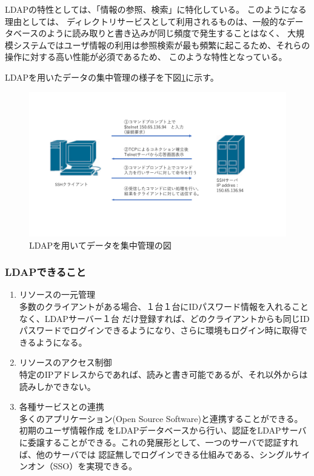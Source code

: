 \documentclass[11pt,a4j,titlepage]{jreport}
\begin{document}
LDAPの特性としては、「情報の参照、検索」に特化している。
このようになる理由としては、
ディレクトリサービスとして利用されるものは、一般的なデータベースのように読み取りと書き込みが同じ頻度で発生することはなく、
大規模システムではユーザ情報の利用は参照検索が最も頻繁に起こるため、それらの操作に対する高い性能が必須であるため、
このような特性となっている。

LDAPを用いたデータの集中管理の様子を下図\ref{LDAP_data_manage}に示す。
\begin{figure}[h]
    \centering
    \includegraphics[width=1.0\textwidth, page=10]{graphs/network_archtecture.pdf}
    \caption{LDAPを用いてデータを集中管理の図}
    \label{LDAP_data_manage}
\end{figure}


\subsubsection*{LDAPできること}
\begin{enumerate}
    \setlength{\parskip}{0.05cm} %
    \setlength{\itemsep}{0.05cm}
    \item リソースの一元管理\mbox{}\\多数のクライアントがある場合、１台１台にIDパスワード情報を入れることなく、LDAPサーバー１台
だけ登録すれば、どのクライアントからも同じIDパスワードでログインできるようになり、さらに環境もログイン時に取得できるようになる。


    \item リソースのアクセス制御\mbox{}\\特定のIPアドレスからであれば、読みと書き可能であるが、それ以外からは読みしかできない。
    \item 各種サービスとの連携\mbox{}\\多くのアプリケーション(Open Source Software)と連携することができる。初期のユーザ情報作成
をLDAPデータベースから行い、認証をLDAPサーバに委譲することができる。これの発展形として、一つのサーバで認証すれば、他のサーバでは
認証無しでログインできる仕組みである、シングルサインオン（SSO）を実現できる。
\end{enumerate}
\end{document}
